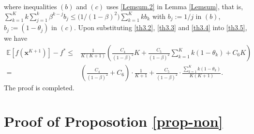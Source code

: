 \documentclass[twoside,11pt]{article}
\begin{document}
where inequalities $(b)$ and $(c)$ uses  \eqref{Lemsum.2} in Lemma \ref{Lemsum}, that is,  $\sum_{k=1}^{K}k\sum_{j=1}^{k}\beta^{k-j}b_j\le \big(1/(1-\beta)^{2}\big)\sum_{k=1}^{K}k b_k$ with $b_j:=1/j$ in $(b)$, $b_j:=(1-\theta_j)$ in $(c)$. Upon substituting \eqref{th3.2}, \eqref{th3.3} and \eqref{th3.4} into \eqref{th3.5}, we have
\begin{equation}
   	\begin{aligned}
   	\mathbb{E}\left[ f(\mathbf{x}^{K+1})\right] -f^*
   	\le&\frac{1}{K(K+1)} \left( \frac{C_4}{(1-\beta)^2} K+\frac{C_5}{(1-\beta)^2}\sum_{k=1}^{K}k(1-\theta_k)+C_6  K\right) \\
   	=&\left( \frac{C_4}{(1-\beta)^2}+C_6\right) \cdot\frac{ 1 }{K+1} +\frac{C_5}{(1-\beta)^2}\cdot\frac{\sum_{k=1}^{K}k(1-\theta_k)}{K(K+1)}.\nonumber
   	\end{aligned}
\end{equation}
The proof is completed.


\section{Proof of Proposotion \ref{prop-non}}\label{A}
\end{document}
